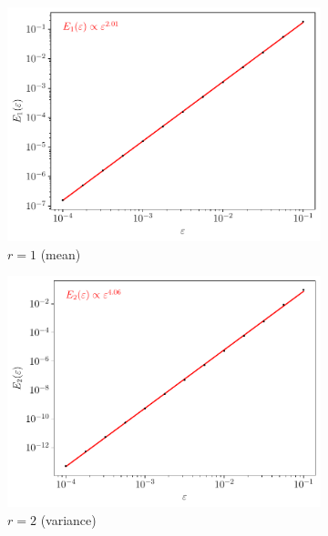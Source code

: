 \begin{figure}
	\begin{center}
		\begin{subfigure}{0.49\textwidth}
			\includegraphics[width=\textwidth]{chp04_paper_numerics/figures/rossby/str_err_r_1.0.pdf}
			\caption{\(r = 1\) (mean)}
			\label{fig:gamma_z_valid_1}
		\end{subfigure}
		\begin{subfigure}{0.49\textwidth}
			\includegraphics[width=\textwidth]{chp04_paper_numerics/figures/rossby/str_err_r_2.0.pdf}
			\caption{\(r = 2\) (variance)}
			\label{fig:gamma_z_valid_2}
		\end{subfigure}
		\begin{subfigure}{0.49\textwidth}

\end{subfigure}
\end{center}
\end{figure}
